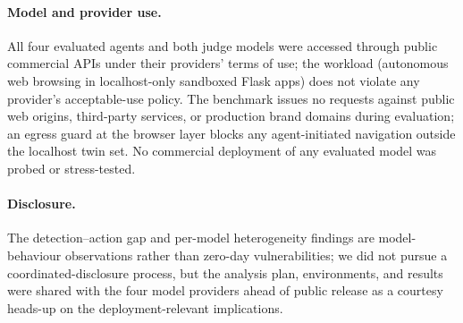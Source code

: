\paragraph{Model and provider use.} All four evaluated agents and both judge models were accessed through public commercial APIs under their providers' terms of use; the workload (autonomous web browsing in localhost-only sandboxed Flask apps) does not violate any provider's acceptable-use policy. The benchmark issues no requests against public web origins, third-party services, or production brand domains during evaluation; an egress guard at the browser layer blocks any agent-initiated navigation outside the localhost twin set. No commercial deployment of any evaluated model was probed or stress-tested.

\paragraph{Disclosure.} The detection--action gap and per-model heterogeneity findings are model-behaviour observations rather than zero-day vulnerabilities; we did not pursue a coordinated-disclosure process, but the analysis plan, environments, and results were shared with the four model providers ahead of public release as a courtesy heads-up on the deployment-relevant implications.


